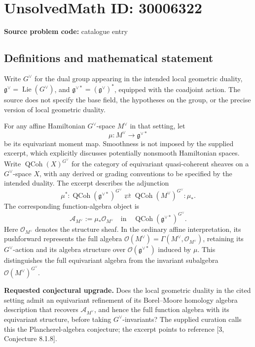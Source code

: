 \documentclass[11pt]{article}
\begin{document}
\section*{UnsolvedMath ID: 30006322}
\textbf{Source problem code:} catalogue entry
\subsection{Definitions and mathematical statement}
Write \(G^\vee\) for the dual group appearing in the intended local geometric duality, \(\mathfrak g^\vee=\operatorname{Lie}(G^\vee)\), and \(\mathfrak g^{\vee *}=(\mathfrak g^\vee)^*\), equipped with the coadjoint action. The source does not specify the base field, the hypotheses on the group, or the precise version of local geometric duality.

For any affine Hamiltonian \(G^\vee\)-space \(M^\vee\) in that setting, let
\[
\mu:M^\vee\longrightarrow\mathfrak g^{\vee *}
\]
be its equivariant moment map. Smoothness is not imposed by the supplied excerpt, which explicitly discusses potentially nonsmooth Hamiltonian spaces. Write \(\operatorname{QCoh}(X)^{G^\vee}\) for the category of equivariant quasi-coherent sheaves on a \(G^\vee\)-space \(X\), with any derived or grading conventions to be specified by the intended duality. The excerpt describes the adjunction
\[
\mu^*:\operatorname{QCoh}(\mathfrak g^{\vee *})^{G^\vee}
\rightleftarrows
\operatorname{QCoh}(M^\vee)^{G^\vee}:\mu_*.
\]
The corresponding function-algebra object is
\[
\mathcal A_{M^\vee}:=\mu_*\mathcal O_{M^\vee}
\quad\text{in}\quad
\operatorname{QCoh}(\mathfrak g^{\vee *})^{G^\vee}.
\]
Here \(\mathcal O_{M^\vee}\) denotes the structure sheaf. In the ordinary affine interpretation, its pushforward represents the full algebra \(\mathcal O(M^\vee)=\Gamma(M^\vee,\mathcal O_{M^\vee})\), retaining its \(G^\vee\)-action and its algebra structure over \(\mathcal O(\mathfrak g^{\vee *})\) induced by \(\mu\). This distinguishes the full equivariant algebra from the invariant subalgebra \(\mathcal O(M^\vee)^{G^\vee}\).

\textbf{Requested conjectural upgrade.} Does the local geometric duality in the cited setting admit an equivariant refinement of its Borel--Moore homology algebra description that recovers \(\mathcal A_{M^\vee}\), and hence the full function algebra with its equivariant structure, before taking \(G^\vee\)-invariants? The supplied curation calls this the Plancherel-algebra conjecture; the excerpt points to reference [3, Conjecture 8.1.8].
\end{document}

